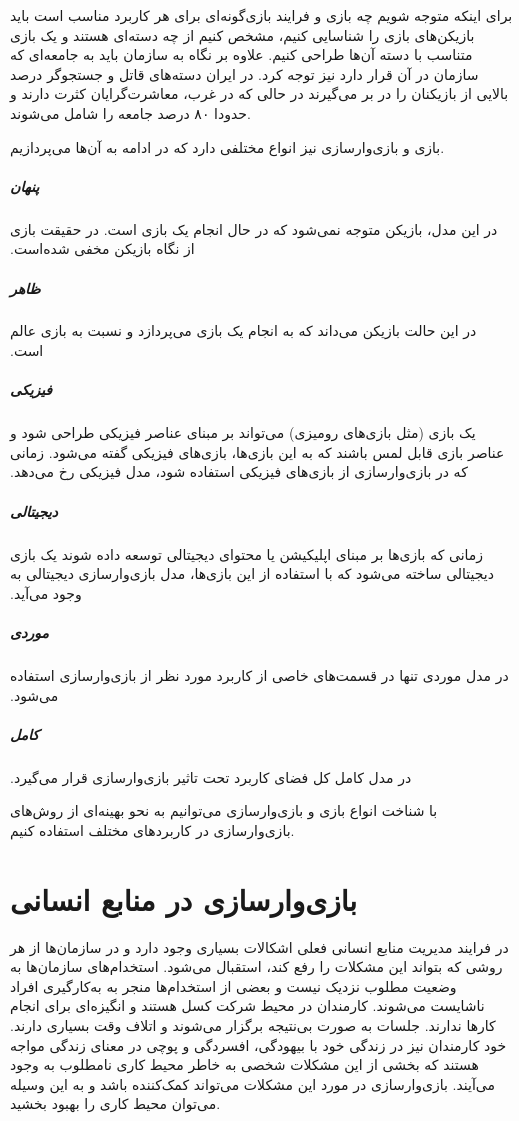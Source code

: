 برای اینکه متوجه شویم چه بازی و فرایند بازی‌گونه‌ای برای هر کاربرد مناسب است باید بازیکن‌های بازی را شناسایی کنیم، مشخص کنیم از چه دسته‌ای هستند و یک بازی متناسب با دسته آن‌ها طراحی کنیم. علاوه بر نگاه به سازمان باید به جامعه‌ای که سازمان در آن قرار دارد نیز توجه کرد. در ایران دسته‌های قاتل و جستجوگر درصد بالایی از بازیکنان را در بر می‌گیرند در حالی که در غرب، معاشرت‌گرایان کثرت دارند و حدودا ۸۰ درصد جامعه را شامل می‌شوند.

بازی و بازی‌وارسازی نیز انواع مختلفی دارد که در ادامه به آن‌ها می‌پردازیم.
\subparagraph{پنهان}‫
در این مدل، بازیکن متوجه نمی‌شود که در حال انجام یک بازی است. در حقیقت بازی از نگاه بازیکن مخفی شده‌است.
\subparagraph{ظاهر}‫
در این حالت بازیکن می‌داند که به انجام یک بازی می‌پردازد و نسبت به بازی عالم است.
\subparagraph{فیزیکی}‫
یک بازی (مثل بازی‌های رومیزی) می‌تواند بر مبنای عناصر فیزیکی طراحی شود و عناصر بازی قابل لمس باشند که به این بازی‌ها، بازی‌های فیزیکی گفته می‌شود. زمانی که در بازی‌وارسازی از بازی‌های فیزیکی استفاده شود، مدل فیزیکی رخ می‌دهد.
\subparagraph{دیجیتالی}‫
زمانی که بازی‌ها بر مبنای اپلیکیشن یا محتوای دیجیتالی توسعه داده شوند یک بازی دیجیتالی ساخته می‌شود که با استفاده از این بازی‌ها، مدل بازی‌وارسازی دیجیتالی به وجود می‌آید.
\subparagraph{موردی}‫
در مدل موردی تنها در قسمت‌های خاصی از کاربرد مورد نظر از بازی‌وارسازی استفاده می‌شود.
\subparagraph{کامل}‫
در مدل کامل کل فضای کاربرد تحت تاثیر بازی‌وارسازی قرار می‌گیرد.

با شناخت انواع بازی و بازی‌وارسازی می‌توانیم به نحو بهینه‌ای از روش‌های بازی‌وارسازی در کاربردهای مختلف استفاده کنیم.

\section{بازی‌وارسازی در منابع انسانی}
در فرایند مدیریت منابع انسانی فعلی اشکالات بسیاری وجود دارد و در سازمان‌ها از هر روشی که بتواند این مشکلات را رفع کند، استقبال می‌شود. استخدام‌های سازمان‌ها به وضعیت مطلوب نزدیک نیست و بعضی از استخدام‌ها منجر به به‌کارگیری افراد ناشایست می‌شوند. کارمندان در محیط شرکت کسل هستند و انگیزه‌ای برای انجام کارها ندارند. جلسات به صورت بی‌نتیجه برگزار می‌شوند و اتلاف وقت بسیاری دارند. خود کارمندان نیز در زندگی خود با بیهودگی، افسردگی و پوچی در معنای زندگی مواجه هستند که بخشی از این مشکلات شخصی به خاطر محیط کاری نامطلوب به وجود می‌آیند. بازی‌وارسازی در مورد این مشکلات می‌تواند کمک‌کننده باشد و به این وسیله می‌توان محیط کاری را بهبود بخشید.

